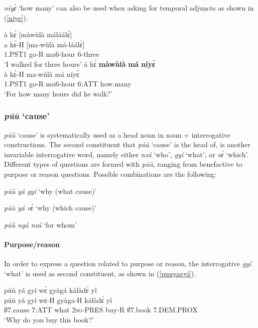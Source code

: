 {\itshape níyɛ̀} `how many' can also be used when asking for temporal adjuncts as shown in (\ref{niye}).

\begin{exe}
\ex\label{niye}
\begin{xlist}
\ex\label{niye1}
 \glll  à kɛ́ [màwùlà máláálɛ̀]  \\
        a kɛ̀-H [ma-wùlà má-láálɛ̀]  \\
          1.PST1 go-R ma6-hour 6-three  \\
    \trans `I walked for three hours'
\ex \label{niye2}
  \glll    à kɛ́ {\bfseries màwùlà} {\bfseries má} {\bfseries níyɛ̀} \\
	à kɛ̀-H ma-wùlà má níyɛ̀ \\
              1.PST1 go-R ma6-hour 6:ATT how.many \\
    \trans `For how many hours did he walk?'
\end {xlist}
\end {exe}

\subsubsection{{\itshape púù} `cause'}
\label{sec:puu}

{\itshape púù} `cause' is systematically used as a head noun in noun + interrogative constructions. The second constituent that {\itshape púù} `cause' is the head of, is another invariable interrogative word, namely either {\itshape nzá} `who', {\itshape gyí} `what', or {\itshape vɛ́} `which'. Different types of questions are formed with {\itshape púù},  ranging from  benefactive to purpose or reason questions. Possible combinations are the following:
 
{\itshape púù yá gyí} `why (what cause)'

{\itshape púù yá vɛ́} `why (which cause)'

{\itshape púù ngá nzá} `for whom'

\paragraph{Purpose/reason} In order to express a question related to purpose or reason, the interrogative {\itshape gyí} `what' is used as second constituent, as shown in (\ref{puuyagyi}).

\begin{exe}
\ex\label{puuyagyi}
 \glll  púù yá gyí wɛ́ gyàgá kálàdɛ̀ yî \\
    púù yá gyí wɛ-H gyàga-H kálàdɛ̀ yî \\
          $\emptyset$7.cause 7:ATT what 2\textsc{sg}-PRES buy-R $\emptyset$7.book 7.DEM.PROX  \\
    \trans `Why do you buy this book?'
\end {exe}

